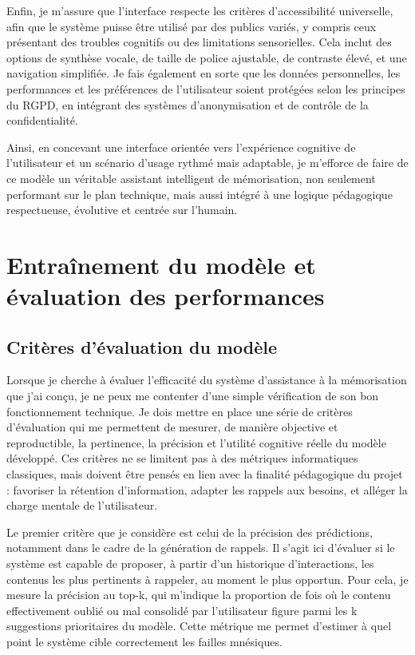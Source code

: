 \documentclass[11pt,a4paper]{report}
\begin{document}
Enfin, je m’assure que l’interface respecte les critères d’accessibilité universelle, afin que le système puisse être utilisé par des publics variés, y compris ceux présentant des troubles cognitifs ou des limitations sensorielles. Cela inclut des options de synthèse vocale, de taille de police ajustable, de contraste élevé, et une navigation simplifiée. Je fais également en sorte que les données personnelles, les performances et les préférences de l’utilisateur soient protégées selon les principes du RGPD, en intégrant des systèmes d’anonymisation et de contrôle de la confidentialité.

Ainsi, en concevant une interface orientée vers l’expérience cognitive de l’utilisateur et un scénario d’usage rythmé mais adaptable, je m’efforce de faire de ce modèle un véritable assistant intelligent de mémorisation, non seulement performant sur le plan technique, mais aussi intégré à une logique pédagogique respectueuse, évolutive et centrée sur l’humain.

\section{Entraînement du modèle et évaluation des performances}

\subsection{Critères d’évaluation du modèle}

Lorsque je cherche à évaluer l’efficacité du système d’assistance à la mémorisation que j’ai conçu, je ne peux me contenter d’une simple vérification de son bon fonctionnement technique. Je dois mettre en place une série de critères d’évaluation qui me permettent de mesurer, de manière objective et reproductible, la pertinence, la précision et l’utilité cognitive réelle du modèle développé. Ces critères ne se limitent pas à des métriques informatiques classiques, mais doivent être pensés en lien avec la finalité pédagogique du projet : favoriser la rétention d’information, adapter les rappels aux besoins, et alléger la charge mentale de l’utilisateur.

Le premier critère que je considère est celui de la précision des prédictions, notamment dans le cadre de la génération de rappels. Il s’agit ici d’évaluer si le système est capable de proposer, à partir d’un historique d’interactions, les contenus les plus pertinents à rappeler, au moment le plus opportun. Pour cela, je mesure la précision au top-k, qui m’indique la proportion de fois où le contenu effectivement oublié ou mal consolidé par l’utilisateur figure parmi les k suggestions prioritaires du modèle. Cette métrique me permet d’estimer à quel point le système cible correctement les failles mnésiques.
\end{document}
